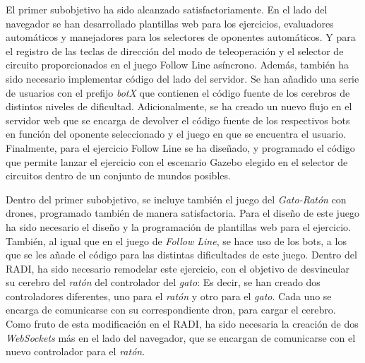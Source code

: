 \documentclass[a4paper, 12pt]{book}
\begin{document}
El primer subobjetivo ha sido alcanzado satisfactoriamente. En el lado del navegador se han desarrollado plantillas web para los ejercicios, evaluadores automáticos y manejadores para los selectores de oponentes automáticos. Y para el registro de las teclas de dirección del modo de teleoperación y el selector de circuito proporcionados en el juego Follow Line asíncrono. Además, también ha sido necesario implementar código del lado del servidor. Se han añadido una serie de usuarios con el prefijo \emph{botX} que contienen el código fuente de los cerebros de distintos niveles de dificultad. Adicionalmente, se ha creado un nuevo flujo en el servidor web que se encarga de devolver el código fuente de los respectivos bots en función del oponente seleccionado y el juego en que se encuentra el usuario. Finalmente, para el ejercicio Follow Line se ha diseñado, y programado el código que permite lanzar el ejercicio con el escenario Gazebo elegido en el selector de circuitos dentro de un conjunto de mundos posibles.

Dentro del primer subobjetivo, se incluye también el juego del \emph{Gato-Ratón} con drones, programado también de manera satisfactoria. Para el diseño de este juego ha sido necesario el diseño y la programación de plantillas web para el ejercicio. También, al igual que en el juego de \emph{Follow Line}, se hace uso de los bots, a los que se les añade el código para las distintas dificultades de este juego. Dentro del RADI, ha sido necesario remodelar este ejercicio, con el objetivo de desvincular su cerebro del \emph{ratón} del controlador del \emph{gato}: Es decir, se han creado dos controladores diferentes, uno para el \emph{ratón} y otro para el \emph{gato}. Cada uno se encarga de comunicarse con su correspondiente dron, para cargar el cerebro. Como fruto de esta modificación en el RADI, ha sido necesaria la creación de dos \emph{WebSockets} más en el lado del navegador, que se encargan de comunicarse con el nuevo controlador para el \emph{ratón}.
\end{document}
